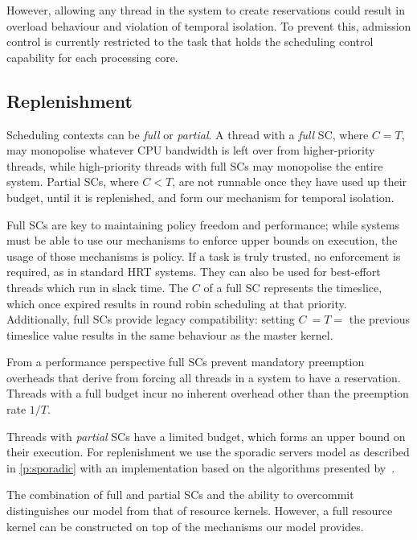 However, allowing any thread in the system to create reservations could result in overload behaviour and violation of temporal isolation.
To prevent this, admission control is currently restricted to the task that holds the scheduling
control capability for each processing core.

\subsection{Replenishment}

Scheduling contexts can be \emph{full} or \emph{partial}. A thread with a \emph{full} SC, where
\(C=T\), may monopolise whatever
CPU bandwidth is left over from higher-priority threads, while high-priority threads with full
\glspl{SC} may monopolise the entire system. 
Partial \glspl{SC}, where \(C<T\), are not runnable once
they have used up their budget, until it is replenished, and form our mechanism for temporal
isolation.  

Full \glspl{SC} are key to maintaining policy freedom and performance; while systems
must be able to use our mechanisms to enforce upper bounds on execution, the usage of 
those mechanisms is policy. If a task is truly trusted, no enforcement is required,
as in standard \gls{HRT} systems. They can also be used for best-effort threads which run in slack time.
The \(C\) of a full \gls{SC} represents the timeslice, which once expired results in round robin
scheduling at that priority. Additionally, full \glspl{SC} provide legacy compatibility: setting \(C\ = T =\)
the previous timeslice value results in the same behaviour as the master kernel. 

From a performance perspective full \glspl{SC} prevent mandatory preemption overheads 
that derive from forcing all threads in a system to have a reservation. Threads with a full
budget incur no inherent overhead other than the preemption rate $1/T$.

Threads with \emph{partial} \glspl{SC} have a limited budget, which forms an upper
bound on their execution. For replenishment we
use the sporadic servers model as described in \cref{p:sporadic} with an
implementation based on the algorithms presented
by~\citet{Stanovic_BWH_10}. 

The combination of full and partial \glspl{SC}  and the ability to overcommit distinguishes our
model from that of resource kernels. However, a full resource kernel can be 
constructed on top of the mechanisms our model provides.

